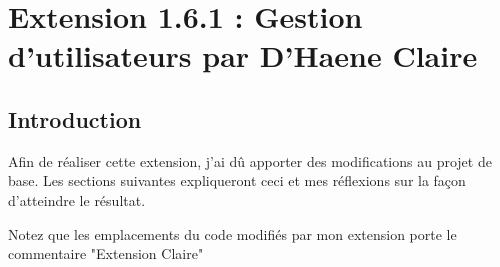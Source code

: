 \section{Extension 1.6.1 : Gestion d’utilisateurs par D’Haene Claire}
\subsection{Introduction}
\begin{flushleft}
Afin de réaliser cette extension, j'ai dû apporter des modifications au projet de base.
Les sections suivantes expliqueront ceci et mes réflexions sur la façon d'atteindre le résultat.
\end{flushleft}

\begin{flushleft}
Notez que les emplacements du code modifiés par mon extension porte le commentaire "Extension Claire"
\end{flushleft} 
